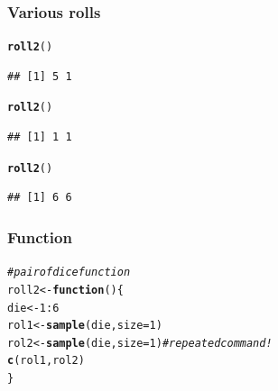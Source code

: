 \documentclass[12pt]{beamer}\usepackage[]{graphicx}\usepackage[]{color}
\makeatletter
\newcommand{\hlnum}[1]{\textcolor[rgb]{0.686,0.059,0.569}{#1}}%
\newcommand{\hlcom}[1]{\textcolor[rgb]{0.678,0.584,0.686}{\textit{#1}}}%
\newcommand{\hlopt}[1]{\textcolor[rgb]{0,0,0}{#1}}%
\newcommand{\hlstd}[1]{\textcolor[rgb]{0.345,0.345,0.345}{#1}}%
\newcommand{\hlkwa}[1]{\textcolor[rgb]{0.161,0.373,0.58}{\textbf{#1}}}%
\newcommand{\hlkwb}[1]{\textcolor[rgb]{0.69,0.353,0.396}{#1}}%
\newcommand{\hlkwc}[1]{\textcolor[rgb]{0.333,0.667,0.333}{#1}}%
\newcommand{\hlkwd}[1]{\textcolor[rgb]{0.737,0.353,0.396}{\textbf{#1}}}%
\newenvironment{kframe}{%
 \def\at@end@of@kframe{}%
 \ifinner\ifhmode%
  \def\at@end@of@kframe{\end{minipage}}%
  \begin{minipage}{\columnwidth}%
 \fi\fi%
 \def\FrameCommand##1{\hskip\@totalleftmargin \hskip-\fboxsep
 \colorbox{shadecolor}{##1}\hskip-\fboxsep
     \hskip-\linewidth \hskip-\@totalleftmargin \hskip\columnwidth}%
 \MakeFramed {\advance\hsize-\width
   \@totalleftmargin\z@ \linewidth\hsize
   \@setminipage}}%
 {\par\unskip\endMakeFramed%
 \at@end@of@kframe}
\newenvironment{knitrout}{}{} %
\makeatother
\begin{document}

\begin{frame}[fragile]
\frametitle{Various rolls}

\begin{knitrout}\footnotesize
{}\color{fgcolor}\begin{kframe}
\begin{alltt}
\hlkwd{roll2}\hlstd{()}
\end{alltt}
\begin{verbatim}
## [1] 5 1
\end{verbatim}
\begin{alltt}
\hlkwd{roll2}\hlstd{()}
\end{alltt}
\begin{verbatim}
## [1] 1 1
\end{verbatim}
\begin{alltt}
\hlkwd{roll2}\hlstd{()}
\end{alltt}
\begin{verbatim}
## [1] 6 6
\end{verbatim}
\end{kframe}
\end{knitrout}

\end{frame}


\begin{frame}[fragile]
\frametitle{Function}

\begin{knitrout}\footnotesize
{}\color{fgcolor}\begin{kframe}
\begin{alltt}
\hlcom{# pair of dice function}
\hlstd{roll2} \hlkwb{<-} \hlkwa{function}\hlstd{() \{}
  \hlstd{die} \hlkwb{<-} \hlnum{1}\hlopt{:}\hlnum{6}
  \hlstd{rol1} \hlkwb{<-} \hlkwd{sample}\hlstd{(die,} \hlkwc{size} \hlstd{=} \hlnum{1}\hlstd{)}
  \hlstd{rol2} \hlkwb{<-} \hlkwd{sample}\hlstd{(die,} \hlkwc{size} \hlstd{=} \hlnum{1}\hlstd{)}  \hlcom{# repeated command!}
  \hlkwd{c}\hlstd{(rol1, rol2)}
\hlstd{\}}
\end{alltt}
\end{kframe}
\end{knitrout}

\end{frame}

\end{document}
